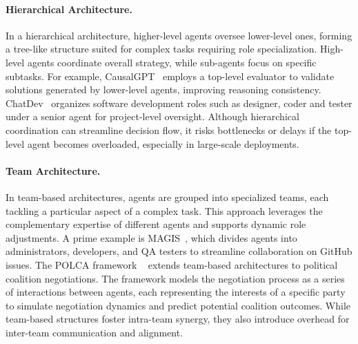\paragraph{Hierarchical Architecture.} In a hierarchical architecture, higher-level agents oversee lower-level ones, forming a tree-like structure suited for complex tasks requiring role specialization. High-level agents coordinate overall strategy, while sub-agents focus on specific subtasks. For example, CausalGPT~\cite{casualgpt_reasoning} employs a top-level evaluator to validate solutions generated by lower-level agents, improving reasoning consistency. ChatDev~\cite{chatdev_software_development} organizes software development roles such as designer, coder and tester under a senior agent for project-level oversight. Although hierarchical coordination can streamline decision flow, it risks bottlenecks or delays if the top-level agent becomes overloaded, especially in large-scale deployments.

\paragraph{Team Architecture.} In team-based architectures, agents are grouped into specialized teams, each tackling a particular aspect of a complex task. This approach leverages the complementary expertise of different agents and supports dynamic role adjustments. A prime example is MAGIS~\cite{magis_mas_for_github}, which divides agents into administrators, developers, and QA testers to streamline collaboration on GitHub issues. The POLCA framework ~\cite{polca_mas_for_political} extends team-based architectures to political coalition negotiations. The framework models the negotiation process as a series of interactions between agents, each representing the interests of a specific party to simulate negotiation dynamics and predict potential coalition outcomes. While team-based structures foster intra-team synergy, they also introduce overhead for inter-team communication and alignment.

